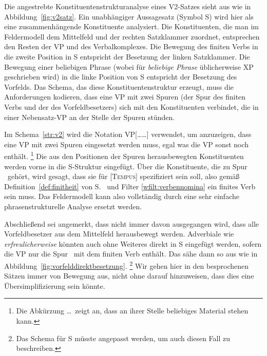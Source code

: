 
Die angestrebte Konstituentenstrukturanalyse eines V2-Satzes sieht aus wie in Abbildung~\ref{fig:v2satz}.
Ein unabhängiger Aussagesatz (Symbol S) wird hier als eine zusammenhängende Konstituente analysiert.
Die Konstituenten, die man im Feldermodell dem Mittelfeld und der rechten Satzklammer zuordnet, entsprechen den Resten der VP und des Verbalkomplexes.
Die Bewegung des finiten Verbs in die zweite Position in S entspricht der Besetzung der linken Satzklammer.
Die Bewegung einer beliebigen Phrase (wobei für \textit{beliebige Phrase} üblicherweise XP geschrieben wird) in die linke Position von S entspricht der Besetzung des Vorfelds.
Das Schema, das diese Konstituentenstruktur erzeugt, muss die Anforderungen kodieren, dass eine VP mit zwei Spuren (der Spur des finiten Verbs und der des Vorfeldbesetzers) sich mit den Konstituenten verbindet, die in einer Nebensatz-VP an der Stelle der Spuren stünden.


Im Schema~\ref{str:v2} wird die Notation VP[\ldots\Ti\ldots\Tii] verwendet, um anzuzeigen, dass eine VP mit zwei Spuren eingesetzt werden muss, egal was die VP sonst noch enthält.%
\footnote{Die Abkürzung \ldots\ zeigt an, dass an ihrer Stelle beliebiges Material stehen kann.}
Die aus den Positionen der Spuren herausbewegten Konstituenten werden vorne in die S-Struktur eingefügt.
Über die Konstituente, die zu Spur \Ti\ gehört, wird gesagt, dass sie für [\textsc{Tempus}] spezifiziert sein soll, also gemäß Definition~\ref{def:finitheit} von S.~\pageref{def:finitheit} und Filter \ref{wfilt:verbennomina} ein finites Verb sein muss.
Das Feldermodell kann also vollständig durch eine sehr einfache phrasenstrukturelle Analyse ersetzt werden.

Abschließend sei angemerkt, dass nicht immer davon ausgegangen wird, dass alle Vorfeldbesetzer aus dem Mittelfeld herausbewegt werden.
Adverbiale wie \textit{erfreulicherweise} \zB könnten auch ohne Weiteres direkt in S eingefügt werden, sofern die VP nur die Spur \Ti\ mit dem finiten Verb enthält.
Das sähe dann so aus wie in Abbildung~\ref{fig:vorfelddirektbesetzung}.%
\footnote{Das Schema für S müsste angepasst werden, um auch diesen Fall zu beschreiben.}
Wir gehen hier in den besprochenen Sätzen immer von Bewegung aus, nicht ohne darauf hinzuweisen, dass dies eine Übersimplifizierung sein könnte.

